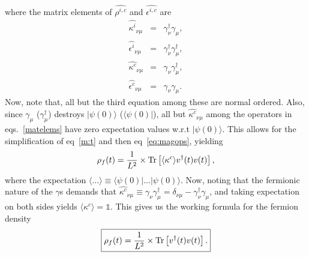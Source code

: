\documentclass[a4paper,10pt]{article}
\begin{document}
where the matrix elements of $\hat{\rho^{i,c}}$ and $\hat{\epsilon^{i,c}}$ are
\begin{eqnarray}
\label{matelems}
\hat{\kappa^i}_{\nu\mu} &=& \gamma^\dagger_\nu\gamma_\mu, \nonumber \\
\hat{\epsilon^i}_{\nu\mu} &=& \gamma^\dagger_\nu\gamma^\dagger_\mu,\nonumber \\
\hat{\kappa^c}_{\nu\mu} &=& \gamma_\nu\gamma^\dagger_\mu, \nonumber \\
\hat{\epsilon^c}_{\nu\mu} &=& \gamma_\nu\gamma_\mu.
\end{eqnarray}
Now, note that, all but the third equation among these are normal ordered. Also, since $\gamma_\mu$ ($\gamma^\dagger_\mu$) destroys $|\psi(0)\rangle$ ($\langle\psi(0)|$), all but $\hat{\kappa^c}_{\nu\mu}$ among the operators in eqs.~\ref{matelems} have zero expectation values w.r.t $|\psi(0)\rangle$. This allows for the simplification of eq~\ref{m:t} and then eq~\ref{eq:magops}, yielding
\begin{equation}
\rho_f(t) = \frac{1}{L^2} \times {\rm Tr}\left[\langle\kappa^c\rangle {v}^\dagger(t) {v}(t)\right],
\end{equation}
where the expectation $\langle\dots\rangle\equiv \langle\psi(0)|\dots|\psi(0)\rangle$. Now, noting that the fermionic nature of the $\gamma$s  demands that $\hat{\kappa^c}_{\nu\mu}\equiv\gamma_\nu\gamma^\dagger_\mu=\delta_{\nu\mu}-\gamma^\dagger_\nu\gamma_\mu$, and taking expectation on both sides yields $\langle\kappa^c\rangle=\mathds{1}$. This gives us the working formula for the fermion density
\begin{equation}
 \label{eq:mag}
\boxed{\rho_f(t) = \frac{1}{L^2} \times {\rm Tr}\left[ {v}^\dagger(t) {v}(t)\right].}
\end{equation}
\end{document}
